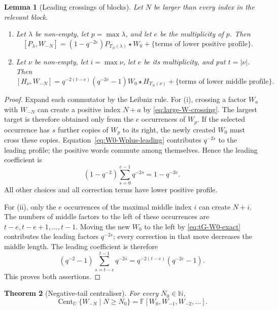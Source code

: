 \documentclass[11pt]{extarticle}
\newtheorem{theorem}{Theorem}[section]
\newtheorem{lemma}[theorem]{Lemma}
\theoremstyle{definition}
\theoremstyle{remark}
\numberwithin{equation}{section}
\newcommand{\F}{\mathbb F}
\newcommand{\N}{\mathbb N}
\DeclareMathOperator{\Cent}{Cent}
\begin{document}
\begin{lemma}[Leading crossings of blocks]
\label{lem:block-leading-crossings}
Let $N$ be larger than every index in the relevant block.
\begin{enumerate}[label=\textup{(\roman*)}]
\item Let $\lambda$ be non-empty, let $p=\max\lambda$, and let $e$ be the
multiplicity of $p$.  Then
\begin{equation}
\label{eq:positive-block-crossing}
 [P_\lambda,W_{-N}]
 =(1-q^{-2e})P_{T_N(\lambda)}\star W_0
 +\{\text{terms of lower positive profile}\}.
\end{equation}
\item Let $\nu$ be non-empty, let $i=\max\nu$, let $e$ be its multiplicity,
and put $t=|\nu|$.  Then
\begin{equation}
\label{eq:middle-block-crossing}
 [H_\nu,W_{-N}]
 =q^{-2(t-e)}(q^{-2e}-1)
 W_0\star H_{T_N(\nu)}
 +\{\text{terms of lower middle profile}\}.
\end{equation}
\end{enumerate}
\end{lemma}

\begin{proof}
Expand each commutator by the Leibniz rule.  For (i), crossing a factor
$W_a$ with $W_{-N}$ can create a positive index $N+a$ by
\eqref{eq:large-W-crossing}.  The largest target is therefore obtained only
from the $e$ occurrences of $W_p$.  If the selected occurrence has $s$
further copies of $W_p$ to its right, the newly created $W_0$ must cross
these copies.  Equation~\eqref{eq:W0-Wplus-leading} contributes
$q^{-2s}$ to the leading profile; the positive words commute among
themselves.  Hence the leading coefficient is
\[
 (1-q^{-2})\sum_{s=0}^{e-1}q^{-2s}=1-q^{-2e}.
\]
All other choices and all correction terms have lower positive profile.

For (ii), only the $e$ occurrences of the maximal middle index $i$ can
create $N+i$.  The numbers of middle factors to the left of these
occurrences are $t-e,t-e+1,\ldots,t-1$.  Moving the new $W_0$ to the left
by \eqref{eq:tG-W0-exact} contributes the leading factors
$q^{-2s}$; every correction in that move decreases the middle length.  The
leading coefficient is therefore
\[
 (q^{-2}-1)\sum_{s=t-e}^{t-1}q^{-2s}
 =q^{-2(t-e)}(q^{-2e}-1).
\]
This proves both assertions.
\end{proof}

\begin{theorem}[Negative-tail centraliser]
\label{thm:tail-centraliser}
For every $N_0\in\N$,
\begin{equation}
\label{eq:tail-centraliser}
 \Cent_U\{W_{-N}\mid N\geq N_0\}
 =\F[W_0,W_{-1},W_{-2},\ldots].
\end{equation}
\end{theorem}
\end{document}
